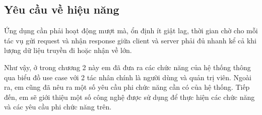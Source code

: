 \documentclass[../DoAn.tex]{subfiles}
\begin{document}
\subsection{Yêu cầu về hiệu năng}
Ứng dụng cần phải hoạt động mượt mà, ổn định ít giật lag, thời gian chờ cho mỗi tác vụ gửi request và nhận response giữa client và server phải đủ nhanh kể cả khi lượng dữ liệu truyền đi hoặc nhận về lớn.

Như vậy, ở trong chương 2 này em đã đưa ra các chức năng của hệ thống thông qua biểu đồ use case với 2 tác nhân chính là người dùng và quản trị viên. Ngoài ra, em cũng đã nêu ra một số yêu cầu phi chức năng cần có của hệ thống. Tiếp đến, em sẽ giới thiệu một số công nghệ được sử dụng để thực hiện các chức năng và các yêu cầu phi chức năng trên.


\end{document}
